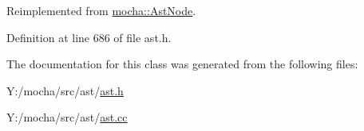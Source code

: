 Reimplemented from \hyperlink{classmocha_1_1_ast_node_a876b49852a3151d977c842a90ee02771}{mocha::AstNode}.



Definition at line 686 of file ast.h.



The documentation for this class was generated from the following files:\begin{DoxyCompactItemize}
\item 
Y:/mocha/src/ast/\hyperlink{ast_8h}{ast.h}\item 
Y:/mocha/src/ast/\hyperlink{ast_8cc}{ast.cc}\end{DoxyCompactItemize}
